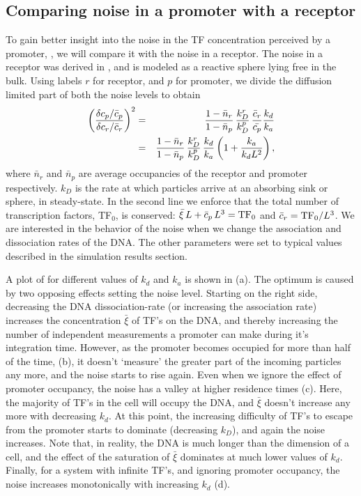 \subsection{Comparing noise in a promoter with a receptor}
To gain better insight into the noise in the TF concentration perceived by a promoter, , we will compare it with the noise in a receptor. The noise in a receptor was derived in \cite{DeRonde2012}, and is modeled as a reactive sphere lying free in the bulk. Using labels $r$ for receptor, and $p$ for promoter, we divide the diffusion limited part of both the noise levels to obtain
\begin{eqnarray}
 \left( \frac{\delta c_p / \bar{c}_p}{\delta c_r / \bar{c}_r} \right)^2 & = & \frac{1-\bar{n}_r}{1-\bar{n}_p} \, \frac{k_D^r}{k_D^p} \, \frac{\bar{c}_r}{\bar{c_p}} \frac{k_d}{k_a} \\
 & = & \frac{1-\bar{n}_r}{1-\bar{n}_p} \, \frac{k_D^r}{k_D^p} \, \frac{k_d}{k_a} \left( 1 + \frac{k_a}{k_d L^2}\right),
 \elabel{NoiseCmpA}
\end{eqnarray}
where $\bar{n}_r$ and $\bar{n}_p$ are average occupancies of the receptor and promoter respectively. $k_D$ is the rate at which particles arrive at an absorbing sink or sphere, in steady-state. In the second line we enforce that the total number of transcription factors, TF$_0$, is conserved: $\bar{\xi} \, L + \bar{c}_p \, L^3 = {\rm TF}_0$ and $\bar{c}_r = {\rm TF}_0/L^3$. We are interested in the behavior of the noise when we change the association and dissociation rates of the DNA. The other parameters were set to typical values described in the simulation results section. 

A plot of  for different values of $k_d$ and $k_a$ is shown in  (a). The optimum is caused by two opposing effects setting the noise level. Starting on the right side, decreasing the DNA dissociation-rate (or increasing the association rate) increases the concentration $\bar{\xi}$ of TF's on the DNA, and thereby increasing the number of independent measurements a promoter can make during it's integration time. However, as the promoter becomes occupied for more than half of the time,  (b), it doesn't `measure' the greater part of the incoming particles any more, and the noise starts to rise again. Even when we ignore the effect of promoter occupancy, the noise has a valley at higher residence times (c). Here, the majority of TF's in the cell will occupy the DNA, and $\bar{\xi}$ doesn't increase any more with decreasing $k_d$. At this point, the increasing difficulty of TF's to escape from the promoter starts to dominate (decreasing $k_D$), and again the noise increases. Note that, in reality, the DNA is much longer than the dimension of a cell, and the effect of the saturation of $\bar{\xi}$ dominates at much lower values of $k_d$. Finally, for a system with infinite TF's, and ignoring promoter occupancy, the noise increases monotonically with increasing $k_d$ (d). 


